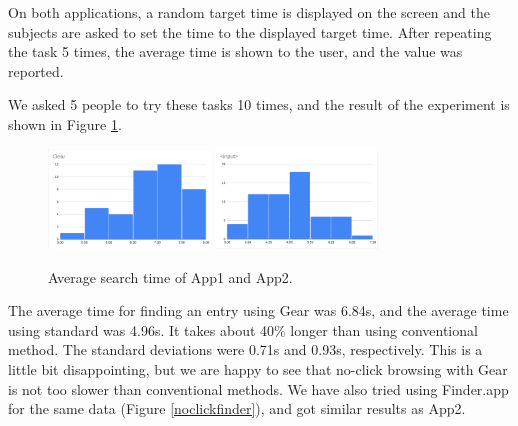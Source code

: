\documentclass[conference]{IEEEtran}
\begin{document}
On both applications, a random target time is displayed on the screen and the subjects are
asked to set the time to the displayed target time.
After repeating the task 5 times, the average time is shown to the user, and the value
was reported.

We asked 5 people to try these tasks 10 times, and the result of the experiment is
shown in Figure \ref{monorailtime}.

\begin{figure}[H]
\centerline{
  \includegraphics[width=43mm,bb=0 0 960 593]{figures/6c39f199b341e30ffc28850afbd90a5a.png}
  \includegraphics[width=43mm,bb=0 0 960 593]{figures/de3f0545e0d0d8dfb9708d2420fb5407.png}
}
\caption{Average search time of App1 and App2.}
\label{monorailtime}
\end{figure}

The average time for finding an entry using Gear was 6.84s,
and the average time using standard  was 4.96s.
It takes about 40\% longer than using conventional method.
The standard deviations were 0.71s and 0.93s, respectively.
%
This is a little bit disappointing,
but we are happy to see that
no-click browsing with Gear is not too slower than
conventional methods.
%
We have also tried using Finder.app for the same data (Figure \ref{noclickfinder}), and
got similar results as App2.

\end{document}
